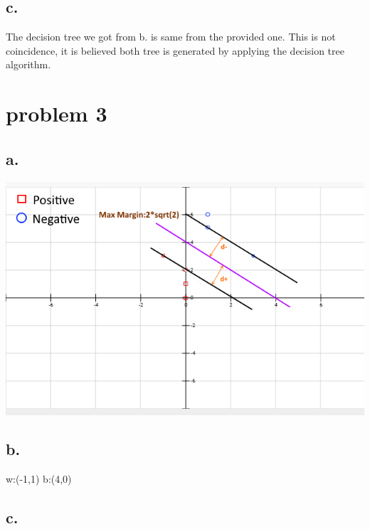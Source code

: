 \documentclass[12pt, letterpaper]{article}
\begin{document}
\subsection{c.}

The decision tree we got from b. is same from the provided one.
This is not coincidence, it is believed both tree is generated by applying the decision tree algorithm.


\section{problem 3}

\subsection{a.}
\includegraphics[scale=0.8]{"problem-3-a"}

\subsection{b.}
w:(-1,1)
b:(4,0)

\subsection{c.}
\end{document}
